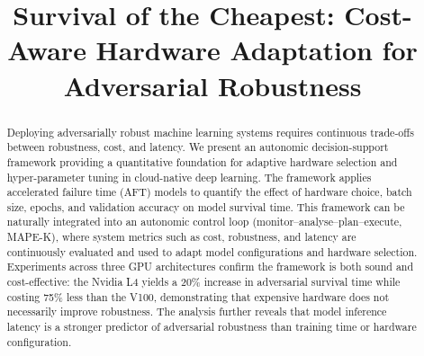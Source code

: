 \documentclass[conference]{IEEEtran}%
\begin{document}
\title{Survival of the Cheapest: Cost-Aware Hardware Adaptation for Adversarial Robustness
}


\author{
\and
{}
\and
{}
\and
{}
}


\maketitle


\begin{abstract}
Deploying adversarially robust machine learning systems requires continuous trade-offs between robustness, cost, and latency.
We present an autonomic decision-support framework providing a quantitative foundation for adaptive hardware selection and hyper-parameter tuning in cloud-native deep learning.
The framework applies accelerated failure time (AFT) models to quantify the effect of hardware choice, batch size, epochs, and validation accuracy on model survival time.
This framework can be naturally integrated into an autonomic control loop (monitor--analyse--plan--execute, MAPE-K), where system metrics such as cost, robustness, and latency are continuously evaluated and used to adapt model configurations and hardware selection.
Experiments across three GPU architectures confirm the framework is both sound and cost-effective: the Nvidia L4 yields a 20\% increase in adversarial survival time while costing 75\% less than the V100, demonstrating that expensive hardware does not necessarily improve robustness. 
The analysis further reveals that model inference latency is a stronger predictor of adversarial robustness than training time or hardware configuration.
\end{abstract}
\end{document}
